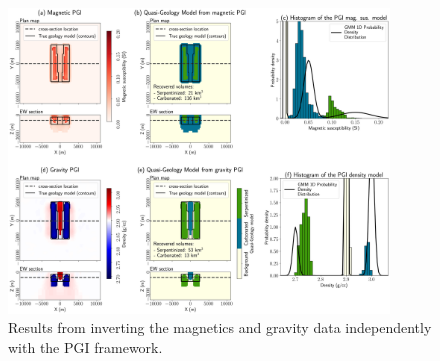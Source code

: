 \begin{figure}[!htb]
    \begin{center}
    \includegraphics[width=0.9\textwidth]{figures/Single-Physics-PGI.png}
    \end{center}
\caption{
    Results from inverting the magnetics and gravity data independently with the PGI framework.
}
\label{fig:single-physics-pgi}
\end{figure}
